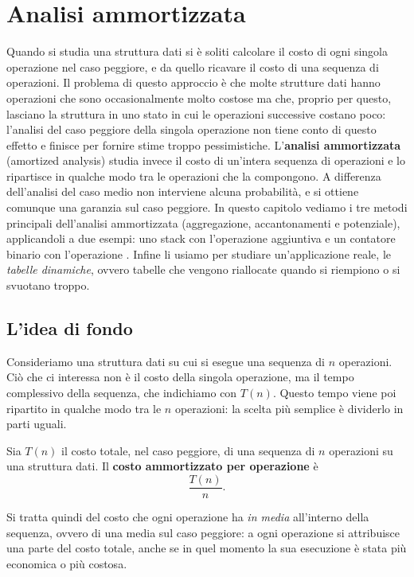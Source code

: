 \chapter{Analisi ammortizzata}\label{ch:ammortizzata}

Quando si studia una struttura dati si è soliti calcolare il costo di ogni singola operazione nel caso peggiore, e da quello ricavare il costo di una sequenza di operazioni. Il problema di questo approccio è che molte strutture dati hanno operazioni che sono occasionalmente molto costose ma che, proprio per questo, lasciano la struttura in uno stato in cui le operazioni successive costano poco: l'analisi del caso peggiore della singola operazione non tiene conto di questo effetto e finisce per fornire stime troppo pessimistiche. L'\textbf{analisi ammortizzata} (amortized analysis) studia invece il costo di un'intera sequenza di operazioni e lo ripartisce in qualche modo tra le operazioni che la compongono. A differenza dell'analisi del caso medio non interviene alcuna probabilità, e si ottiene comunque una garanzia sul caso peggiore. In questo capitolo vediamo i tre metodi principali dell'analisi ammortizzata (aggregazione, accantonamenti e potenziale), applicandoli a due esempi: uno stack con l'operazione aggiuntiva \MultiPop{} e un contatore binario con l'operazione \Increment{}. Infine li usiamo per studiare un'applicazione reale, le \emph{tabelle dinamiche}, ovvero tabelle che vengono riallocate quando si riempiono o si svuotano troppo.

\section{L'idea di fondo}\label{sec:idea}
Consideriamo una struttura dati su cui si esegue una sequenza di $n$ operazioni. Ciò che ci interessa non è il costo della singola operazione, ma il tempo complessivo della sequenza, che indichiamo con $T(n)$. Questo tempo viene poi ripartito in qualche modo tra le $n$ operazioni: la scelta più semplice è dividerlo in parti uguali.

\begin{definizione}\label{def:ammortizzato}
Sia $T(n)$ il costo totale, nel caso peggiore, di una sequenza di $n$ operazioni su una struttura dati. Il \textbf{costo ammortizzato per operazione} è
\[
\frac{T(n)}{n}.
\]
\end{definizione}

Si tratta quindi del costo che ogni operazione ha \emph{in media} all'interno della sequenza, ovvero di una media sul caso peggiore: a ogni operazione si attribuisce una parte del costo totale, anche se in quel momento la sua esecuzione è stata più economica o più costosa.

